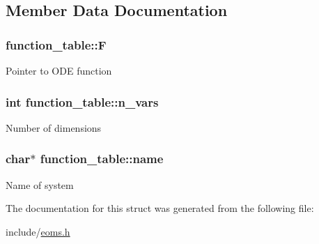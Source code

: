 \subsection{Member Data Documentation}
\hypertarget{structfunction__table_a9788c2e52edde5a8e37d1e7b4ea6b234}{
\subsubsection[{F}]{ function\-\_\-table\-::\-F}}\label{structfunction__table_a9788c2e52edde5a8e37d1e7b4ea6b234}
Pointer to O\-D\-E function \hypertarget{structfunction__table_ae4e3f9023fbce759fc423e921e51d43f}{
\subsubsection[{n\-\_\-vars}]{\setlength{\rightskip}{0pt plus 5cm}int function\-\_\-table\-::n\-\_\-vars}}\label{structfunction__table_ae4e3f9023fbce759fc423e921e51d43f}
Number of dimensions \hypertarget{structfunction__table_a99650448c98f34476adf6caf60a22df2}{
\subsubsection[{name}]{\setlength{\rightskip}{0pt plus 5cm}char$\ast$ function\-\_\-table\-::name}}\label{structfunction__table_a99650448c98f34476adf6caf60a22df2}
Name of system 

The documentation for this struct was generated from the following file\-:\begin{DoxyCompactItemize}
\item 
include/\hyperlink{eoms_8h}{eoms.\-h}\end{DoxyCompactItemize}
